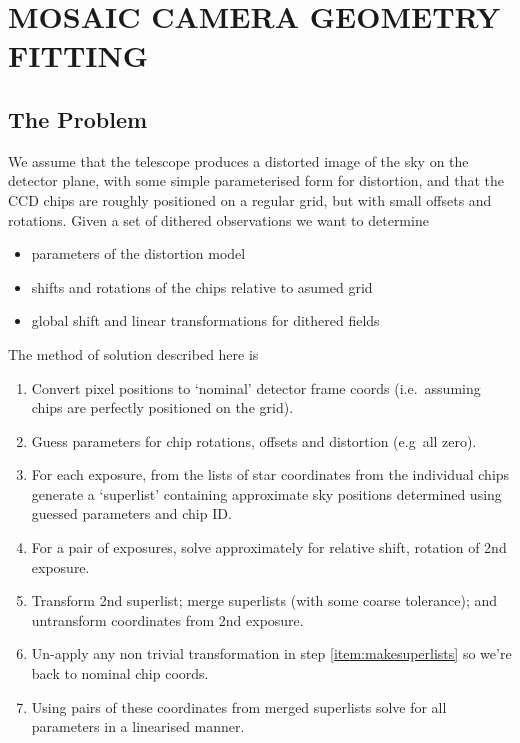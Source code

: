 


\section{MOSAIC CAMERA GEOMETRY FITTING}

\subsection{The Problem}

We assume that the telescope produces a distorted image of
the sky on the detector plane, with some simple parameterised
form for distortion, and that the CCD chips are roughly
positioned on a regular grid, but with small offsets and
rotations.  Given a set of dithered observations we want to
determine
\begin{itemize}
\item parameters of the distortion model
\item shifts and rotations of the chips relative to asumed grid
\item global shift and linear transformations for dithered fields
\end{itemize}
The method of solution described here is
\begin{enumerate}
\item Convert pixel positions to `nominal' detector frame coords
(i.e.~assuming chips are perfectly positioned on the grid).
\item Guess parameters for chip rotations, offsets and distortion (e.g~all
zero).
\item \label{item:makesuperlists} For each exposure, from the
lists of star coordinates from the individual chips
generate a `superlist' containing
approximate sky positions determined using guessed parameters
and chip ID. 
\item For a pair of exposures, solve approximately for relative shift,
rotation of 2nd exposure.
\item Transform 2nd superlist; merge superlists (with some coarse
tolerance); and untransform coordinates from 2nd exposure.
\item Un-apply any non trivial transformation in step
\ref{item:makesuperlists} so we're back to nominal chip coords.
\item Using pairs of these coordinates from merged superlists solve for
all parameters in a linearised manner.
\end{enumerate}
